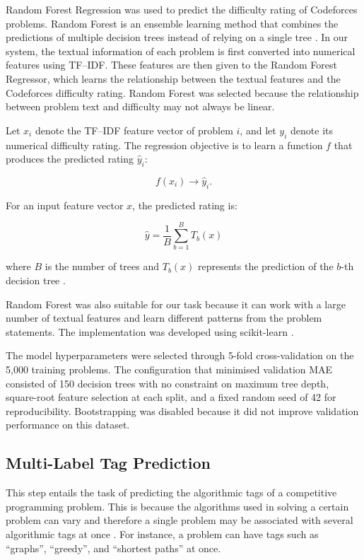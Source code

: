 \documentclass[conference]{IEEEtran}
\begin{document}
Random Forest Regression was used to predict the difficulty rating of
Codeforces problems. Random Forest is an ensemble learning method that
combines the predictions of multiple decision trees instead of relying on
a single tree \cite{breiman2001}. In our system, the textual information of each problem is first converted
into numerical features using TF--IDF. These features are then given to the
Random Forest Regressor, which learns the relationship between the textual
features and the Codeforces difficulty rating. Random Forest was selected
because the relationship between problem text and difficulty may not always
be linear.

Let $x_i$ denote the TF--IDF feature vector of problem $i$, and let $y_i$
denote its numerical difficulty rating. The regression objective is to learn
a function $f$ that produces the predicted rating $\hat{y}_i$:

\begin{equation}
f(x_i) \rightarrow \hat{y}_i.
\end{equation}

For an input feature vector $x$, the predicted rating is:

\begin{equation}
\hat{y}
=
\frac{1}{B}
\sum_{b=1}^{B}
T_b(x)
\end{equation}

where $B$ is the number of trees and $T_b(x)$ represents the prediction of
the $b$-th decision tree \cite{breiman2001}.

Random Forest was also suitable for our task because it can work with a
large number of textual features and learn different patterns from the
problem statements. The implementation was developed using scikit-learn
\cite{sklearn2011}.

The model hyperparameters were selected through 5-fold cross-validation on
the 5,000 training problems. The configuration that minimised validation MAE
consisted of 150 decision trees with no constraint on maximum tree depth,
square-root feature selection at each split, and a fixed random seed of 42
for reproducibility. Bootstrapping was disabled because it did not improve
validation performance on this dataset.

\subsection{Multi-Label Tag Prediction}
This step entails the task of predicting the algorithmic tags of a competitive programming problem. This is because the algorithms used in solving a certain problem can vary and therefore a single problem may be associated with several algorithmic tags at once \cite{tsoumakas2007}. For instance, a problem can have tags such as “graphs”, “greedy”, and “shortest paths” at once.
\end{document}
